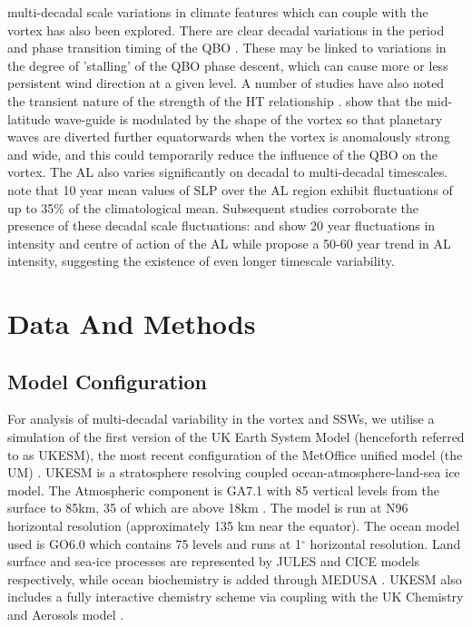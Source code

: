 multi-decadal scale variations in climate features which can couple with the vortex has also been explored. There are clear decadal variations in the period and phase transition timing of the QBO \citep{Pascoe2005,Anstey2008,Yang2016}. These may be linked to variations in the degree of 'stalling' of the QBO phase descent, which can cause more or less persistent wind direction at a given level.  A number of studies have also noted the transient nature of the strength of the HT relationship \citep{Lu2008,Lu14,Anstey2008,OspEA10}. \cite{Lu2008,Lu14} show that the mid-latitude wave-guide is modulated by the shape of the vortex so that planetary waves are diverted further equatorwards when the vortex is anomalously strong and wide, and this could temporarily reduce the influence of the QBO on the vortex. The AL also varies significantly on decadal to multi-decadal timescales. \cite{Overland1999} note that 10 year mean values of SLP over the AL region exhibit fluctuations of up to 35\% of the climatological mean. Subsequent studies corroborate the presence of these decadal scale fluctuations: \cite{SUGIMOTO2009} and \cite{Minobe} show 20 year fluctuations in intensity and centre of action of the AL while \cite{Raible2005} propose a 50-60 year trend in AL intensity, suggesting the existence of even longer timescale variability. 

\section{Data And Methods}
\subsection{Model Configuration}
\label{sec:model_config}
For analysis of multi-decadal variability in the vortex and SSWs, we utilise a simulation of the first version of the UK Earth System Model (henceforth referred to as UKESM), the most recent configuration of the MetOffice unified model (the UM) \citep{Mulcahy2018}. UKESM is a stratosphere resolving coupled ocean-atmosphere-land-sea ice model. The Atmospheric component is GA7.1 with 85 vertical levels from the surface to 85km, 35 of which are above 18km \citep{Walters2019, Williams2018}. The model is run at N96 horizontal resolution (approximately 135 km near the equator). The ocean model used is GO6.0 \citep{Storkey2018} which contains 75 levels and runs at 1${^\circ}$ horizontal resolution. Land surface and sea-ice processes are represented by JULES \citep[GL7.0,][]{Walters2019} and CICE  \cite[GSI8.1,][]{Ridley2018} models respectively, while ocean biochemistry is added through MEDUSA \citep{Yool2013}. UKESM also includes a fully interactive chemistry scheme via coupling with the UK Chemistry and Aerosols model \citep[UKCA,][]{Mulcahy2018}.

